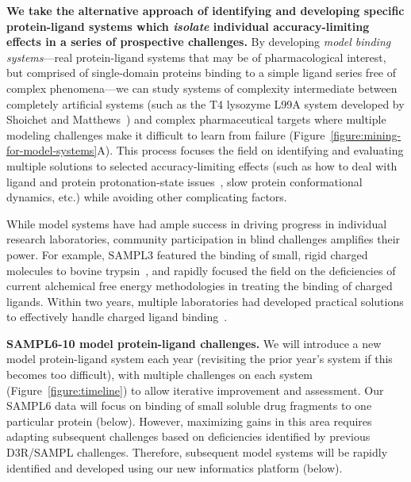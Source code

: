 \documentclass[11pt]{article}
\begin{document}
{\bf We take the alternative approach of identifying and developing specific protein-ligand systems which \emph{isolate} individual accuracy-limiting effects in a series of prospective challenges.}
By developing \emph{model binding systems}---real protein-ligand systems that may be of pharmacological interest, but comprised of single-domain proteins binding to a simple ligand series free of complex phenomena---we can study systems of complexity intermediate between completely artificial systems (such as the T4 lysozyme L99A system developed by Shoichet and Matthews~\cite{mobley_predicting_2007,merski_homologous_2015, mobley_predicting_2016}) and complex pharmaceutical targets where multiple modeling challenges make it difficult to learn from failure (Figure~\ref{figure:mining-for-model-systems}A).
This process focuses the field on identifying and evaluating multiple solutions to selected accuracy-limiting effects (such as how to deal with ligand and protein protonation-state issues~\cite{Onufriev:2013:QuarterlyReviewsofBiophysics}, slow protein conformational dynamics, etc.) while avoiding other complicating factors.

While model systems have had ample success in driving progress in individual research laboratories, community participation in blind challenges amplifies their power.
For example, SAMPL3 featured the binding of small, rigid charged molecules to bovine trypsin~\cite{Newman:2011:JComputAidedMolDes}, and rapidly focused the field on the deficiencies of current alchemical free energy methodologies in treating the binding of charged ligands.
Within two years, multiple laboratories had developed practical solutions to effectively handle charged ligand binding~\cite{Rocklin:2013:TheJournalofChemicalPhysics, lin_overview_2014, Reif:2014:JournalofComputationalChemistry}.

{\bf SAMPL6-10 model protein-ligand challenges.} 
We will introduce a new model protein-ligand system each year (revisiting the prior year's system if this becomes too difficult), with multiple challenges on each system (Figure~\ref{figure:timeline}) to allow iterative improvement and assessment.
Our SAMPL6 data will focus on binding of small soluble drug fragments to one particular protein (below). 
However, maximizing gains in this area requires adapting subsequent challenges based on deficiencies identified by previous D3R/SAMPL challenges.
Therefore, subsequent model systems will be rapidly identified and developed using our new informatics platform (below).
\end{document}
